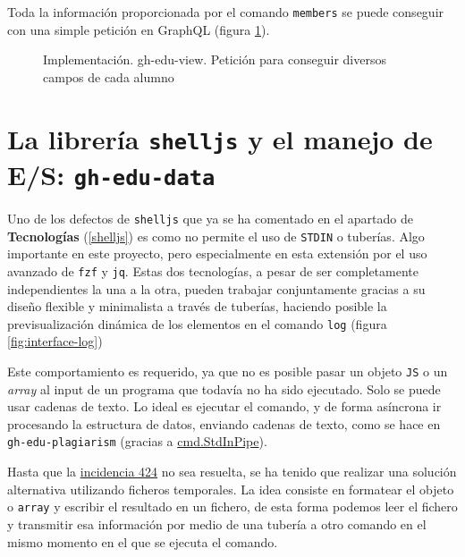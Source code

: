 Toda la información proporcionada por el comando \verb|members| se puede conseguir con una simple petición en GraphQL (figura \ref{fig:viewQuery}).

\begin{figure}[H]
    \centering
    \caption{Implementación. gh-edu-view. Petición para conseguir diversos campos de cada alumno}
    \label{fig:viewQuery}
\end{figure}

\section{{La librería \tt shelljs} y el manejo de E/S: {\tt gh-edu-data}} \label{impl:gh-edu-data}
Uno de los defectos de \verb|shelljs| que ya se ha comentado en el apartado de \textbf{Tecnologías} (\ref{shelljs}) es como no permite el uso de \verb|STDIN| o tuberías. Algo importante en este proyecto, pero especialmente en esta extensión por el uso avanzado de \verb|fzf| y \verb|jq|. Estas dos tecnologías, a pesar de ser completamente independientes la una a la otra, pueden trabajar conjuntamente gracias a su diseño flexible y minimalista a través de tuberías, haciendo posible la previsualización dinámica de los elementos en el comando \verb|log| (figura \ref{fig:interface-log})

Este comportamiento es requerido, ya que no es posible pasar un objeto \verb|JS| o un \emph{array} al input de un programa que todavía no ha sido ejecutado. Solo se puede usar cadenas de texto. Lo ideal es ejecutar el comando, y de forma asíncrona ir procesando la estructura de datos, enviando cadenas de texto, como se hace en \verb|gh-edu-plagiarism| (gracias a \href{https://pkg.go.dev/os/exec@go1.18.3#Cmd.StdinPipe}{cmd.StdInPipe}).

Hasta que la \href{https://github.com/shelljs/shelljs/issues/424}{incidencia 424} no sea resuelta, se ha tenido que realizar una solución alternativa utilizando ficheros temporales. La idea consiste en formatear el objeto o \verb|array| y escribir el resultado en un fichero, de esta forma podemos leer el fichero y transmitir esa información por medio de una tubería a otro comando en el mismo momento en el que se ejecuta el comando.

